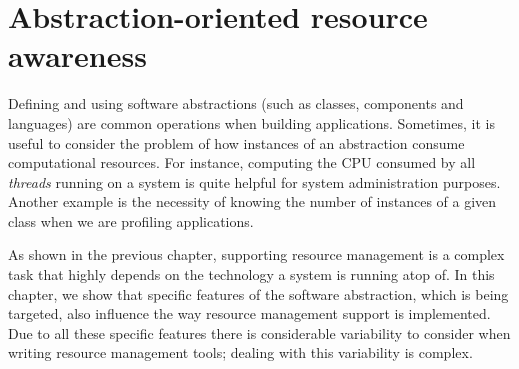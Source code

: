 \chapter{Abstraction-oriented resource awareness}
\label{chap:abstractions_and_resource_management}


Defining and using software abstractions (such as classes, components and languages) are common operations when building applications.
Sometimes, it is useful to consider the problem of how instances of an abstraction consume computational resources.
For instance, computing the CPU consumed by all \textit{threads} running on a system is quite helpful for system administration purposes.
Another example is the necessity of knowing the number of instances of a given class when we are profiling applications.

As shown in the previous chapter, supporting resource management is a complex task that highly depends on the technology a system is running atop of.
In this chapter, we show that specific features of the software abstraction, which is being targeted, also influence the way resource management support is implemented.
Due to all these specific features there is considerable variability to consider when writing resource management tools; dealing with this variability is complex.


